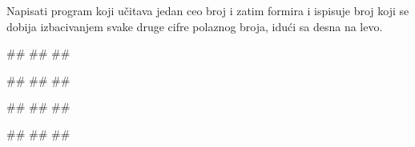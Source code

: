 \begin{Exercise}[label=PET_28]
Napisati program koji učitava jedan ceo broj i zatim formira i ispisuje broj 
koji se dobija izbacivanjem svake druge cifre polaznog broja, idući sa desna na levo.
 
\begin{miditest}
\begin{upotreba}{1}
#\naslovInt#
##
##
\end{upotreba}
\end{miditest}
\begin{miditest}
\begin{upotreba}{2}
#\naslovInt#
##
##
\end{upotreba}
\end{miditest}

\begin{miditest}
\begin{upotreba}{3}
#\naslovInt#
##
##
\end{upotreba}
\end{miditest}
\begin{miditest}
\begin{upotreba}{4}
#\naslovInt#
##
##
\end{upotreba}
\end{miditest}

\end{Exercise}
\ifresenja
\begin{Answer}[ref=PET_28]
\end{Answer}
\fi


